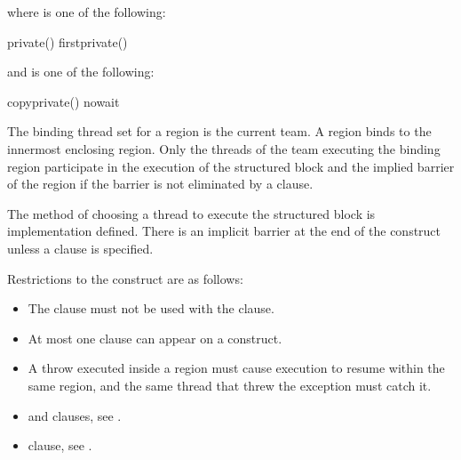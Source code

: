where  is one of the following:

\begin{indentedcodelist}
private()
firstprivate()
\end{indentedcodelist}

and  is one of the following: 

\begin{indentedcodelist}
copyprivate()
nowait
\end{indentedcodelist}
\fortranspecificend

\binding
The binding thread set for a  region is the current team. A  region 
binds to the innermost enclosing  region. Only the threads of the team 
executing the binding  region participate in the execution of the structured 
block and the implied barrier of the  region if the barrier is not eliminated by a 
 clause.

\descr
The method of choosing a thread to execute the structured block is implementation 
defined. There is an implicit barrier at the end of the  construct unless a 
 clause is specified. 

\restrictions
Restrictions to the  construct are as follows: 

\begin{itemize}
\item The  clause must not be used with the  clause.

\item At most one  clause can appear on a  construct.

\cppspecificstart
\item A throw executed inside a  region must cause execution to resume within the 
same  region, and the same thread that threw the exception must catch it.
\cppspecificend
\end{itemize}


\crossreferences
\begin{itemize}
\item {} and  clauses, see 
.

\item {} clause, see 
.
\end{itemize}



